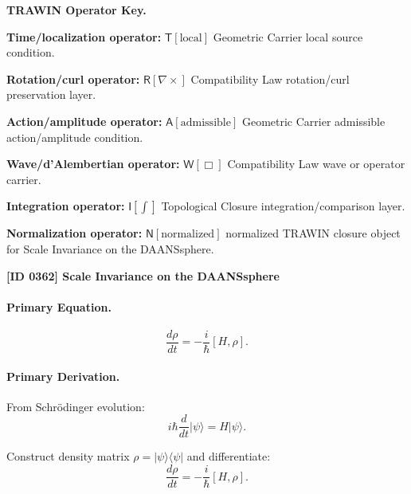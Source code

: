 \par\vspace{0.45\baselineskip}
\noindent\begin{minipage}[t]{\linewidth}
\begingroup
\small
\raggedright
\textbf{TRAWIN Operator Key.}\par
\noindent\textbf{Time/localization operator:} $\mathsf{T}\!\left[\mathrm{local}\right]$ Geometric Carrier local source condition.\par
\noindent\textbf{Rotation/curl operator:} $\mathsf{R}\!\left[\nabla\times\right]$ Compatibility Law rotation/curl preservation layer.\par
\noindent\textbf{Action/amplitude operator:} $\mathsf{A}\!\left[\mathrm{admissible}\right]$ Geometric Carrier admissible action/amplitude condition.\par
\noindent\textbf{Wave/d'Alembertian operator:} $\mathsf{W}\!\left[\Box\right]$ Compatibility Law wave or operator carrier.\par
\noindent\textbf{Integration operator:} $\mathsf{I}\!\left[\int\right]$ Topological Closure integration/comparison layer.\par
\noindent\textbf{Normalization operator:} $\mathsf{N}\!\left[\mathrm{normalized}\right]$ normalized TRAWIN closure object for Scale Invariance on the DAANSsphere.\par
\endgroup
\end{minipage}

\clearpage
\noindent\textbf{[ID 0362] Scale Invariance on the DAANSsphere}\par
\vspace{0.35em}
\paragraph{Primary Equation.}
\begin{equation}
\frac{d\rho}{dt} = -\frac{i}{\hbar}[H,\rho].
\end{equation}

\paragraph{Primary Derivation.}
From Schrödinger evolution:
\begin{equation}
i\hbar \frac{d}{dt}|\psi\rangle = H|\psi\rangle.
\end{equation}

Construct density matrix $\rho = |\psi\rangle\langle \psi|$ and differentiate:
\begin{equation}
\frac{d\rho}{dt} = -\frac{i}{\hbar}[H,\rho].
\end{equation}

